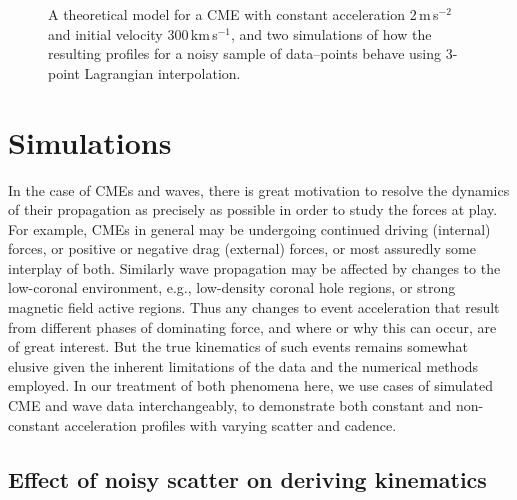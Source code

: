 \documentclass[structabstract]{aa}
\begin{document}
\begin{figure}[!ht]
\caption{A theoretical model for a CME with constant acceleration 2\,m\,s$^{-2}$ and initial velocity 300\,km\,s$^{-1}$, and two simulations of how the resulting profiles for a noisy sample of data--points behave using 3-point Lagrangian interpolation.}
\label{sim_vels_thesis}
\end{figure}

\section{Simulations}
\label{sect:simul1}

In the case of CMEs and waves, there is great motivation to resolve the dynamics of their propagation as precisely as possible in order to study the forces at play. For example, CMEs in general may be undergoing continued driving (internal) forces, or positive or negative drag (external) forces, or most assuredly some interplay of both. Similarly wave propagation may be affected by changes to the low-coronal environment, e.g., low-density coronal hole regions, or strong magnetic field active regions. Thus any changes to event acceleration that result from different phases of dominating force, and where or why this can occur, are of great interest. But the true kinematics of such events remains somewhat elusive given the inherent limitations of the data and the numerical methods employed. In our treatment of both phenomena here, we use cases of simulated CME and wave data interchangeably, to demonstrate both constant and non-constant acceleration profiles with varying scatter and cadence.


\subsection{Effect of noisy scatter on deriving kinematics}
\label{subsect:test_lagrange_const}
\end{document}
